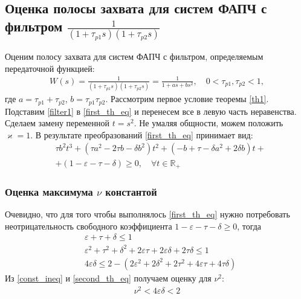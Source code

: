 \documentclass[a4paper,article,14pt]{extarticle}
\begin{document}
\subsection{Оценка полосы захвата для систем ФАПЧ с фильтром $\frac{1}{(1+\tau_{p1}s)(1+\tau_{p2}s)}$}
Оценим полосу захвата для систем ФАПЧ с фильтром, определяемым передаточной функцией:
 \begin{equation}\label{filter1}
 \begin{aligned}
W(s) = \frac{1}{(1+\tau_{p1}s)(1+\tau_{p2}s)} = \frac{1}{1+as + bs^2}, \quad 0<\tau_{p1},\tau_{p2} < 1,
 \end{aligned}
\end{equation}
где $a = \tau_{p1}+\tau_{p2}$, $b = \tau_{p1}\tau_{p2}$. Рассмотрим первое условие теоремы \ref{th1}. Подставим \eqref{filter1} в \eqref{first_th_eq} и перенесем все в левую часть неравенства. Сделаем замену переменной $t = s^2$. Не умаляя общности, можем положить $\varkappa = 1$. В результате преобразований \eqref{first_th_eq} принимает вид:
\begin{equation}\label{first_condition}
 \begin{aligned}
&\tau b^2t^3 + (\tau a^2-2 \tau b - \delta b^2)t^2 + (- b+\tau-\delta a^2 + 2\delta b)t +\\
&+ (1-\varepsilon-\tau-\delta) \geqslant 0, \quad \forall t \in \mathbb{R_+}
 \end{aligned}
\end{equation}

\subsubsection{Оценка максимума $\nu$ константой}
Очевидно, что для того чтобы выполнялось \eqref{first_th_eq} нужно потребовать неотрицательность свободного коэффициента $1 - \varepsilon - \tau - \delta \geqslant 0$, тогда
 \begin{align}
&\varepsilon+\tau+\delta \leqslant 1 \\
&\varepsilon^2 + \tau^2 + \delta^2 + 2\varepsilon\tau + 2\varepsilon\delta + 2\tau\delta \leqslant 1\\
&4\varepsilon\delta \leqslant 2 -(2\varepsilon^2 + 2\delta^2 + 2\tau^2 +4\varepsilon\tau + 4\tau\delta)\label{const_ineq}
 \end{align}
Из \eqref{const_ineq} и \eqref{second_th_eq} получаем оценку для $\nu^2$:
\begin{equation}
 \begin{aligned}
\nu^2 < 4\varepsilon\delta < 2
 \end{aligned}
\end{equation}
\end{document}

